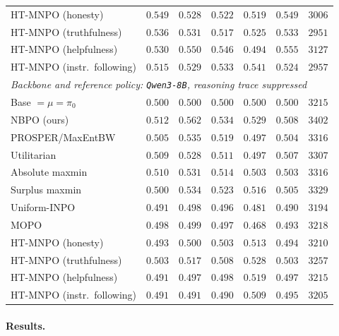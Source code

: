 \documentclass{article}
\theoremstyle{remark}
\theoremstyle{plain}
\newcommand{\NBPO}{\textsc{NBPO}}
\begin{document}
\begin{table}[t]
\begin{tabular}{lrrrrrr}
HT-MNPO (honesty) & $0.549$ & $0.528$ & $0.522$ & $0.519$ & $0.549$ & $3006$ \\
HT-MNPO (truthfulness) & $0.536$ & $0.531$ & $0.517$ & $0.525$ & $0.533$ & $2951$ \\
HT-MNPO (helpfulness) & $0.530$ & $0.550$ & $0.546$ & $0.494$ & $0.555$ & $3127$ \\
HT-MNPO (instr.\ following) & $0.515$ & $0.529$ & $0.533$ & $0.541$ & $0.524$ & $2957$ \\
\midrule
\multicolumn{7}{l}{\textit{Backbone and reference policy: \texttt{Qwen3-8B}, reasoning trace suppressed}}\\
Base $=\mu=\pi_0$ & $0.500$ & $0.500$ & $0.500$ & $0.500$ & $0.500$ & $3215$ \\
\NBPO{} (ours) & $\mathbf{0.512}$ & $\mathbf{0.562}$ & $\mathbf{0.534}$ & $\mathbf{0.529}$ & $\mathbf{0.508}$ & $3402$ \\
PROSPER/MaxEntBW & $0.505$ & $0.535$ & $0.519$ & $0.497$ & $0.504$ & $3316$ \\
Utilitarian & $0.509$ & $0.528$ & $0.511$ & $0.497$ & $0.507$ & $3307$ \\
Absolute maxmin & $0.510$ & $0.531$ & $0.514$ & $0.503$ & $0.503$ & $3316$ \\
Surplus maxmin & $0.500$ & $0.534$ & $0.523$ & $0.516$ & $0.505$ & $3329$ \\
Uniform-INPO & $0.491$ & $0.498$ & $0.496$ & $0.481$ & $0.490$ & $3194$ \\
MOPO & $0.498$ & $0.499$ & $0.497$ & $0.468$ & $0.493$ & $3218$ \\
HT-MNPO (honesty) & $0.493$ & $0.500$ & $0.503$ & $0.513$ & $0.494$ & $3210$ \\
HT-MNPO (truthfulness) & $0.503$ & $0.517$ & $0.508$ & $0.528$ & $0.503$ & $3257$ \\
HT-MNPO (helpfulness) & $0.491$ & $0.497$ & $0.498$ & $0.519$ & $0.497$ & $3215$ \\
HT-MNPO (instr.\ following) & $0.491$ & $0.491$ & $0.490$ & $0.509$ & $0.495$ & $3205$ \\
\bottomrule
\end{tabular}
\end{table}



\paragraph{Results.}
\end{document}
